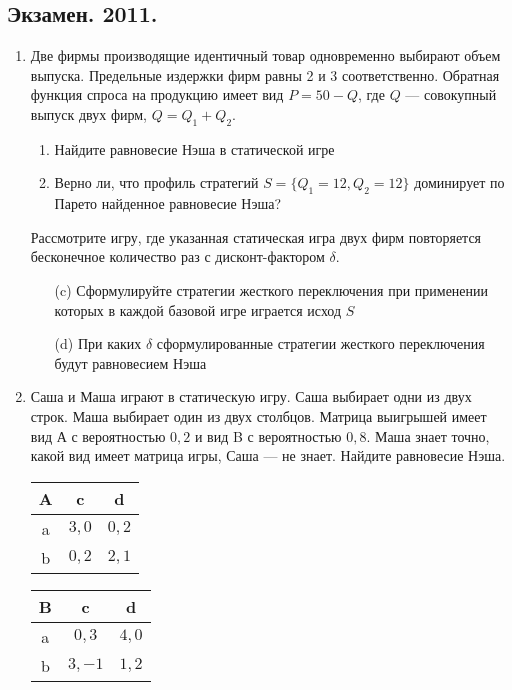 \documentclass[pdftex,12pt,a4paper]{article}
\begin{document}
\subsection{Экзамен. 2011.} 

\begin{enumerate}
\item Две фирмы производящие идентичный товар одновременно выбирают объем выпуска. Предельные издержки фирм равны 2 и 3 соответственно. Обратная функция спроса на продукцию имеет вид $P=50-Q$, где $Q$ --- совокупный выпуск двух фирм, $Q=Q_1+Q_2$.
\begin{enumerate}
\item Найдите равновесие Нэша в статической игре
\item Верно ли, что профиль стратегий $S=\{Q_1=12,Q_2=12\}$ доминирует по Парето найденное равновесие Нэша?
\end{enumerate}
Рассмотрите игру, где указанная статическая игра двух фирм повторяется бесконечное количество раз с дисконт-фактором $\delta$. 
\begin{enumerate}
\item[(c)] Сформулируйте стратегии жесткого переключения при применении которых в каждой базовой игре играется исход $S$
\item[(d)] При каких $\delta$ сформулированные стратегии жесткого переключения будут равновесием Нэша
\end{enumerate}


\item Саша и Маша играют в статическую игру. Саша выбирает одни из двух строк. Маша выбирает один из двух столбцов. Матрица выигрышей имеет вид А с вероятностью $0{,}2$ и вид B с вероятностью $0{,}8$. Маша знает точно, какой вид имеет матрица игры, Саша --- не знает. Найдите равновесие Нэша.


\begin{tabular}{c|cc}
A & c & d \\ 
\hline 
a & $3,0$ & $0,2$ \\ 
b & $0,2$ & $2,1$ \\ 
\end{tabular} 


\begin{tabular}{c|cc}
B & c & d \\ 
\hline 
a & $0,3$ & $4,0$ \\ 
b & $3,-1$ & $1,2$ \\ 
\end{tabular} 




\end{enumerate}
\end{document}
